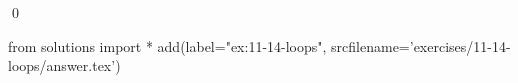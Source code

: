 
\begin{ex}
  \label{ex:11-14-loops}
  
  \qed
\end{ex}
\begin{python0}
from solutions import *
add(label="ex:11-14-loops",
    srcfilename='exercises/11-14-loops/answer.tex')
\end{python0}
